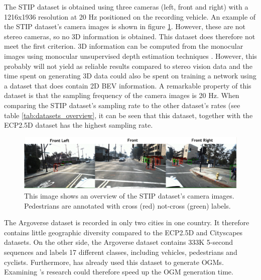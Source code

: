The \gls{STIP} dataset \cite{liu2020spatiotemporal} is obtained using three cameras (left, front and right) with a 1216x1936 resolution at 20 Hz positioned on the recording vehicle. An example of the \gls{STIP} dataset's camera images is shown in figure \ref{fig:dat_stip}. However, these are not stereo cameras, so no 3D information is obtained. This dataset does therefore not meet the first criterion. 3D information can be computed from the monocular images using monocular unsupervised depth estimation techniques \cite{godard2017unsupervised}. However, this probably will not yield as reliable results compared to stereo vision data and the time spent on generating 3D data could also be spent on training a network using a dataset that does contain 2D \gls{BEV} information. A remarkable property of this dataset is that the sampling frequency of the camera images is 20 Hz. When comparing the \gls{STIP} dataset's sampling rate to the other dataset's rates (see table \ref{tab:datasets_overview}, it can be seen that this dataset, together with the \gls{ECP2.5D} \cite{braun2020ecp2} dataset has the highest sampling rate. \\

\begin{figure}[h!]
	\centering
	\includegraphics[width=0.8\linewidth]{Figures/Datasets/STIP_Dataset}
	\caption{This image shows an overview of the \gls{STIP} \cite{liu2020spatiotemporal} dataset's camera images. Pedestrians are annotated with cross (red) not-cross (green) labels.  \cite{liu2020spatiotemporal}}  
	\label{fig:dat_stip}
\end{figure}

The Argoverse dataset \cite{chang2019argoverse} is recorded in only two cities in one country. It therefore contains little geographic diversity compared to the \gls{ECP2.5D} \cite{braun2020ecp2} and Cityscapes \cite{cordts2016cityscapes} datasets. On the other side, the Argoverse dataset \cite{chang2019argoverse} contains 333K 5-second sequences and labels 17 different classes, including vehicles, pedestrians and cyclists. Furthermore, \cite{roddick2020predicting} has already used this dataset to generate \glspl{OGM}. Examining \cite{roddick2020predicting}'s research could therefore speed up the \gls{OGM} generation time. \\

